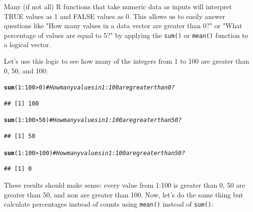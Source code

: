 \documentclass{tufte-book}\usepackage[]{graphicx}\usepackage[]{color}
\makeatletter
\newcommand{\hlnum}[1]{\textcolor[rgb]{0.686,0.059,0.569}{#1}}%
\newcommand{\hlcom}[1]{\textcolor[rgb]{0.678,0.584,0.686}{\textit{#1}}}%
\newcommand{\hlopt}[1]{\textcolor[rgb]{0,0,0}{#1}}%
\newcommand{\hlstd}[1]{\textcolor[rgb]{0.345,0.345,0.345}{#1}}%
\newcommand{\hlkwd}[1]{\textcolor[rgb]{0.737,0.353,0.396}{\textbf{#1}}}%
\newenvironment{kframe}{%
 \def\at@end@of@kframe{}%
 \ifinner\ifhmode%
  \def\at@end@of@kframe{\end{minipage}}%
  \begin{minipage}{\columnwidth}%
 \fi\fi%
 \def\FrameCommand##1{\hskip\@totalleftmargin \hskip-\fboxsep
 \colorbox{shadecolor}{##1}\hskip-\fboxsep
     \hskip-\linewidth \hskip-\@totalleftmargin \hskip\columnwidth}%
 \MakeFramed {\advance\hsize-\width
   \@totalleftmargin\z@ \linewidth\hsize
   \@setminipage}}%
 {\par\unskip\endMakeFramed%
 \at@end@of@kframe}
\newenvironment{knitrout}{}{} %
\makeatother
\begin{document}
\begin{footnotesize}
Many (if not all) R functions that take numeric data as inputs will interpret TRUE values as 1 and FALSE values as 0. This allows us to easily answer questions like "How many values in a data vector are greater than 0?" or "What percentage of values are equal to 5?" by applying the \texttt{sum()} or \texttt{mean()} function to a logical vector.

Let's use this logic to see how many of the integers from 1 to 100 are greater than 0, 50, and 100:

\begin{knitrout}
\color{fgcolor}\begin{kframe}
\begin{alltt}
\hlkwd{sum}\hlstd{(}\hlnum{1}\hlopt{:}\hlnum{100} \hlopt{>} \hlnum{0}\hlstd{)} \hlcom{# How many values in 1:100 are greater than 0?}
\end{alltt}
\begin{verbatim}
## [1] 100
\end{verbatim}
\begin{alltt}
\hlkwd{sum}\hlstd{(}\hlnum{1}\hlopt{:}\hlnum{100} \hlopt{>} \hlnum{50}\hlstd{)} \hlcom{# How many values in 1:100 are greater than 50?}
\end{alltt}
\begin{verbatim}
## [1] 50
\end{verbatim}
\begin{alltt}
\hlkwd{sum}\hlstd{(}\hlnum{1}\hlopt{:}\hlnum{100} \hlopt{>} \hlnum{100}\hlstd{)} \hlcom{# How many values in 1:100 are greater than 50?}
\end{alltt}
\begin{verbatim}
## [1] 0
\end{verbatim}
\end{kframe}
\end{knitrout}

These results should make sense: every value from 1:100 is greater than 0, 50 are greater than 50, and non are greater than 100. Now, let's do the same thing but calculate percentages instead of counts using \texttt{mean()} instead of \texttt{sum()}:


\end{footnotesize}
\end{document}
